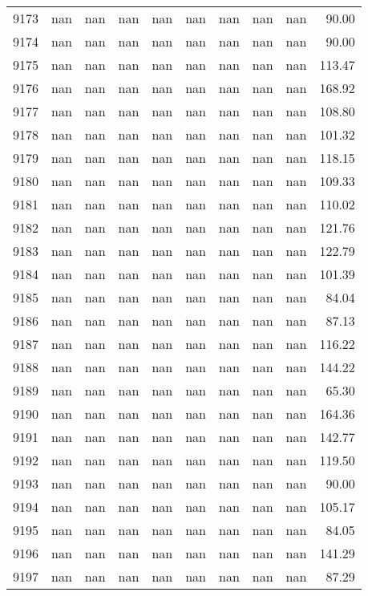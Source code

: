 \begin{tabular}{lrrrrrrrrr}
9173 & nan & nan & nan & nan & nan & nan & nan & nan & 90.00 \\
9174 & nan & nan & nan & nan & nan & nan & nan & nan & 90.00 \\
9175 & nan & nan & nan & nan & nan & nan & nan & nan & 113.47 \\
9176 & nan & nan & nan & nan & nan & nan & nan & nan & 168.92 \\
9177 & nan & nan & nan & nan & nan & nan & nan & nan & 108.80 \\
9178 & nan & nan & nan & nan & nan & nan & nan & nan & 101.32 \\
9179 & nan & nan & nan & nan & nan & nan & nan & nan & 118.15 \\
9180 & nan & nan & nan & nan & nan & nan & nan & nan & 109.33 \\
9181 & nan & nan & nan & nan & nan & nan & nan & nan & 110.02 \\
9182 & nan & nan & nan & nan & nan & nan & nan & nan & 121.76 \\
9183 & nan & nan & nan & nan & nan & nan & nan & nan & 122.79 \\
9184 & nan & nan & nan & nan & nan & nan & nan & nan & 101.39 \\
9185 & nan & nan & nan & nan & nan & nan & nan & nan & 84.04 \\
9186 & nan & nan & nan & nan & nan & nan & nan & nan & 87.13 \\
9187 & nan & nan & nan & nan & nan & nan & nan & nan & 116.22 \\
9188 & nan & nan & nan & nan & nan & nan & nan & nan & 144.22 \\
9189 & nan & nan & nan & nan & nan & nan & nan & nan & 65.30 \\
9190 & nan & nan & nan & nan & nan & nan & nan & nan & 164.36 \\
9191 & nan & nan & nan & nan & nan & nan & nan & nan & 142.77 \\
9192 & nan & nan & nan & nan & nan & nan & nan & nan & 119.50 \\
9193 & nan & nan & nan & nan & nan & nan & nan & nan & 90.00 \\
9194 & nan & nan & nan & nan & nan & nan & nan & nan & 105.17 \\
9195 & nan & nan & nan & nan & nan & nan & nan & nan & 84.05 \\
9196 & nan & nan & nan & nan & nan & nan & nan & nan & 141.29 \\
9197 & nan & nan & nan & nan & nan & nan & nan & nan & 87.29 \\

\end{tabular}
